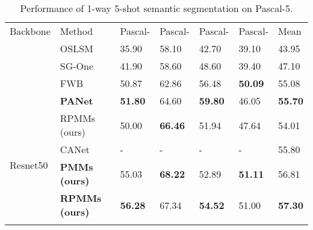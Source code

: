 \documentclass[runningheads]{llncs}
\begin{document}
\setlength{\tabcolsep}{4pt}
\begin{table}[t]
\begin{center}
\caption{Performance of 1-way 5-shot semantic segmentation on Pascal-5.}
\label{table:5shot}
\begin{tabular}{lllllll}
\hline\noalign{\smallskip}
Backbone & Method & Pascal- & Pascal- & Pascal- & Pascal- & Mean \\
\noalign{\smallskip}
\hline
\noalign{\smallskip}
\multirow{5}{*}{VGG16} & OSLSM~\cite{OSLSM} & 35.90 & 58.10 & 42.70 & 39.10 & 43.95 \\
  & SG-One~\cite{SG-One}                    & 41.90 & 58.60 & 48.60 &39.40 & 47.10  \\
  & FWB~\cite{FWB-ICCV2019}                 & 50.87 & 62.86 & 56.48 &\bf 50.09 & 55.08 \\
  & \bf PANet~\cite{PANet}                  & \bf51.80 & 64.60 & \bf59.80 & 46.05 & \bf55.70 \\
& {RPMMs (ours)}                          & 50.00 & \bf66.46 & 51.94 & 47.64 & 54.01\\
\hline
\multirow{2}{*}{Resnet50} 
& CANet~\cite{CaNet}                       &- &- &- &- & 55.80 \\
& {\bf PMMs (ours)}                        &55.03  &\bf68.22  &52.89  &\bf51.11  &56.81  \\
& \bf RPMMs (ours)                         &\bf56.28 &67.34 &\bf54.52 &51.00 &\bf57.30\\
\hline
\vspace{-0.2cm}
\end{tabular}
\end{center}
\end{table}
\setlength{\tabcolsep}{1.4pt}
\end{document}
